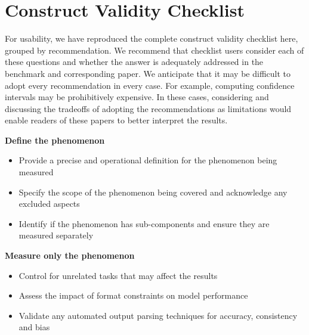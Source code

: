 \clearpage
\section{Construct Validity Checklist}

For usability, we have reproduced the complete construct validity checklist here, grouped by recommendation. We recommend that checklist users consider each of these questions and whether the answer is adequately addressed in the benchmark and corresponding paper. We anticipate that it may be difficult to adopt every recommendation in every case. For example, computing confidence intervals may be prohibitively expensive. In these cases, considering and discussing the tradeoffs of adopting the recommendations as limitations would enable readers of these papers to better interpret the results.

\textbf{Define the phenomenon}
\begin{itemize}[leftmargin=25pt, label=\scriptsize$\square$]
        \item Provide a precise and operational definition for the phenomenon being measured
        \item Specify the scope of the phenomenon being covered and acknowledge any excluded aspects
        \item Identify if the phenomenon has sub-components and ensure they are measured separately
    \end{itemize}

\textbf{Measure only the phenomenon}
\begin{itemize}[leftmargin=25pt, label=\scriptsize$\square$]
    \item Control for unrelated tasks that may affect the results
\item Assess the impact of format constraints on model performance
\item Validate any automated output parsing techniques for accuracy, consistency and bias

\end{itemize}

